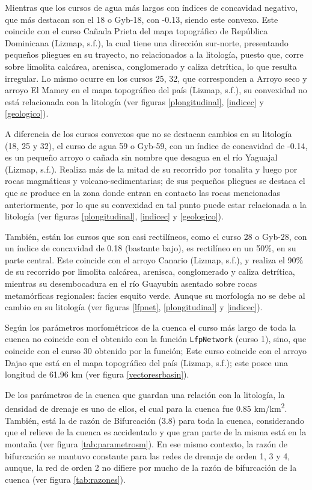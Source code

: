 \documentclass[11pt,]{article}
\begin{document}
Mientras que los cursos de agua más largos con índices de concavidad
negativo, que más destacan son el 18 o Gyb-18, con -0.13, siendo este
convexo. Este coincide con el curso Cañada Prieta del mapa topográfico
de República Dominicana (Lizmap, s.f.), la cual tiene una dirección
sur-norte, presentando pequeños pliegues en su trayecto, no relacionados
a la litología, puesto que, corre sobre limolita calcárea, arenisca,
conglomerado y caliza detrítica, lo que resulta irregular. Lo mismo
ocurre en los cursos 25, 32, que corresponden a Arroyo seco y arroyo El
Mamey en el mapa topográfico del país (Lizmap, s.f.), su convexidad no
está relacionada con la litología (ver figuras \ref{plongitudinal},
\ref{indicec} y \ref{geologico}).

A diferencia de los cursos convexos que no se destacan cambios en su
litología (18, 25 y 32), el curso de agua 59 o Gyb-59, con un índice de
concavidad de -0.14, es un pequeño arroyo o cañada sin nombre que
desagua en el río Yaguajal (Lizmap, s.f.). Realiza más de la mitad de su
recorrido por tonalita y luego por rocas magmáticas y
volcano-sedimentarias; de sus pequeños pliegues se destaca el que se
produce en la zona donde entran en contacto las rocas mencionadas
anteriormente, por lo que su convexidad en tal punto puede estar
relacionada a la litología (ver figuras \ref{plongitudinal},
\ref{indicec} y \ref{geologico}).

También, están los cursos que son casi rectilíneos, como el curso 28 o
Gyb-28, con un índice de concavidad de 0.18 (bastante bajo), es
rectilíneo en un 50\%, en su parte central. Este coincide con el arroyo
Canario (Lizmap, s.f.), y realiza el 90\% de su recorrido por limolita
calcárea, arenisca, conglomerado y caliza detrítica, mientras su
desembocadura en el río Guayubín asentado sobre rocas metamórficas
regionales: facies esquito verde. Aunque su morfología no se debe al
cambio en su litología (ver figuras \ref{lfpnet}, \ref{plongitudinal} y
\ref{indicec}).

Según los parámetros morfométricos de la cuenca el curso más largo de
toda la cuenca no coincide con el obtenido con la función
\texttt{LfpNetwork} (curso 1), sino, que coincide con el curso 30
obtenido por la función; Este curso coincide con el arroyo Dajao que
está en el mapa topográfico del país (Lizmap, s.f.); este posee una
longitud de 61.96 km (ver figura \ref{vectoresrbasin}).

De los parámetros de la cuenca que guardan una relación con la
litología, la densidad de drenaje es uno de ellos, el cual para la
cuenca fue 0.85 km/km\textsuperscript{2}. También, está la de razón de
Bifurcación (3.8) para toda la cuenca, considerando que el relieve de la
cuenca es accidentado y que gran parte de la misma está en la montaña
(ver figura \ref{tab:parametrosm}). En ese mismo contexto, la razón de
bifurcación se mantuvo constante para las redes de drenaje de orden 1, 3
y 4, aunque, la red de orden 2 no difiere por mucho de la razón de
bifurcación de la cuenca (ver figura \ref{tab:razones}).
\end{document}

